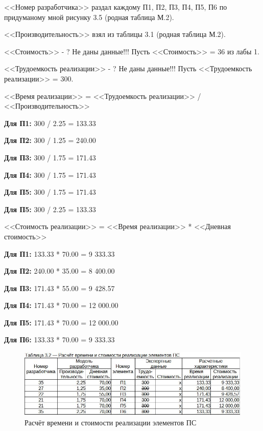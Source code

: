 \documentclass[12pt, a4paper, simple]{eskdtext}
\begin{document}
    \newpage

    <<Номер разработчика>> раздал каждому П1, П2, П3, П4, П5, П6 по придуманому мной рисунку 3.5 (родная таблица М.2).

    <<Производительность>> взял из таблицы 3.1 (родная таблица М.2).

    <<Стоимость>> - ? Не даны данные!!! Пусть <<Стоимость>> = 36 из лабы 1.

    <<Трудоемкость реализации>> - ? Не даны данные!!! Пусть <<Трудоемкость реализации>> = 300.

    <<Время реализации>> = <<Трудоемкость реализации>> / <<Производительность>>

    \textbf{Для П1:} 300 / 2.25 = 133.33

    \textbf{Для П2:} 300 / 1.25 = 240.00

    \textbf{Для П3:} 300 / 1.75 = 171.43

    \textbf{Для П4:} 300 / 1.75 = 171.43

    \textbf{Для П5:} 300 / 1.75 = 171.43

    \textbf{Для П5:} 300 / 2.25 = 133.33

    <<Стоимость реализации>> = <<Время реализации>> * <<Дневная стоимость>>

    \textbf{Для П1:} 133.33 * 70.00 = 9 333.33

    \textbf{Для П2:} 240.00 * 35.00 = 8 400.00

    \textbf{Для П3:} 171.43 * 55.00 = 9 428.57

    \textbf{Для П4:} 171.43 * 70.00 = 12 000.00

    \textbf{Для П5:} 171.43 * 70.00 = 12 000.00

    \textbf{Для П6:} 133.33 * 70.00 = 9 333.33

    \begin{figure}[ph!]
        \centering
        \includegraphics[width=16cm]
            {_docs/Таблица3-2РасчётВремениИСтоимостиРеализацииЭлементовПС.jpg}
        \caption{Расчёт времени и стоимости реализации элементов ПС}
    \end{figure}
\end{document}
